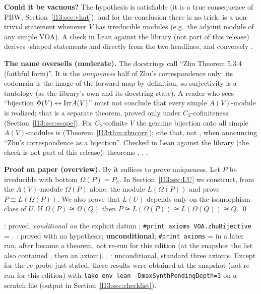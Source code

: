 \begin{dictionary}
\textbf{Could it be vacuous?} The hypothesis  is satisfiable (it is a true consequence of PBW,
Section~\ref{l13:sec:vhat}), and for the conclusion there is no trick:  is a non-trivial
statement whenever $V$ has irreducible modules (e.g.\ the adjoint module of any simple VOA). A
check in Lean against the library (not part of this release) derives -shaped statements 
and  directly from the two headlines, and conversely .
\end{dictionary}

\begin{warning}
\textbf{The name oversells (moderate).} The docstrings call  ``Zhu Theorem 5.3.4 (faithful form)''. It
is the \emph{uniqueness} half of Zhu's correspondence only: its codomain  is the image of the
forward map by definition, so surjectivity is a tautology (as the library's own 
and its docstring state). A reader who sees ``bijection $\Phi(V)\leftrightarrow\mathrm{Irr} A(V)$'' must not conclude
that every simple $A(V)$-module is realized; that is a separate theorem, proved only under $C_2$-cofiniteness
(Section~\ref{l13:sec:scope}). For $C_2$-cofinite $V$ the genuine bijection onto all simple $A(V)$-modules is
 (Theorem~\ref{l13:thm:zhucorr}); cite that, not , when announcing
``Zhu's correspondence as a bijection''. Checked in Lean against the library (the check is not part of this release):
theorems , ,
.
\end{warning}

\textbf{Proof on paper (overview).} By  it suffices to prove uniqueness. Let
$P$ be irreducible with bottom $\Omega(P) = P_h$. In Section~\ref{l13:sec:LU} we construct, from the $A(V)$-module
$\Omega(P)$ alone, the module $L(\Omega(P))$ and prove $P\cong L(\Omega(P))$. We also prove that $L(U)$ depends only on
the isomorphism class of $U$. If $\Omega(P)\cong\Omega(Q)$ then
$P\cong L(\Omega(P))\cong L(\Omega(Q))\cong Q$. \qed

\begin{status}
: proved, \emph{conditional on} the explicit datum ; \texttt{\#print axioms VOA.zhuBijective}
= . : proved with no hypothesis; \textbf{unconditional};
\texttt{\#print axioms} =  in a later run, after  became a theorem, not re-run for this edition (at the snapshot
the list also contained , then an axiom). , : unconditional,
standard three axioms. Except for the re-probe just stated, these results were obtained at the snapshot (not re-run for this edition) with
\texttt{lake env lean -DmaxSynthPendingDepth=3} on a scratch file (output in Section~\ref{l13:sec:checklist}).
\end{status}

